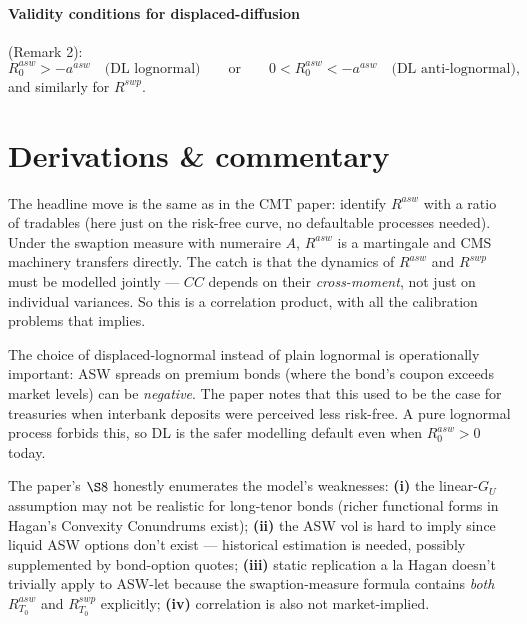 \documentclass[11pt,a4paper]{article}
\begin{document}
\paragraph{Validity conditions for displaced-diffusion} (Remark 2):
\begin{equation}\label{eq:cmasw-dl-validity}
  R^{asw}_0 > -a^{asw} \quad \text{(DL lognormal)} \qquad \text{or} \qquad 0 < R^{asw}_0 < -a^{asw} \quad \text{(DL anti-lognormal)},
\end{equation}
and similarly for $R^{swp}$.

\section{Derivations \& commentary}

\begin{commentary}
The headline move is the same as in the CMT paper: identify
$R^{asw}$ with a ratio of tradables (here just on the risk-free curve,
no defaultable processes needed). Under the swaption measure with
numeraire $A$, $R^{asw}$ is a martingale and CMS machinery transfers
directly. The catch is that the dynamics of $R^{asw}$ and $R^{swp}$
must be modelled jointly --- $CC$ depends on their
\emph{cross-moment}, not just on individual variances. So this is a
correlation product, with all the calibration problems that implies.
\end{commentary}

\begin{commentary}
The choice of displaced-lognormal instead of plain lognormal is
operationally important: ASW spreads on premium bonds (where the
bond's coupon exceeds market levels) can be \emph{negative}. The
paper notes that this used to be the case for treasuries when
interbank deposits were perceived less risk-free. A pure lognormal
process forbids this, so DL is the safer modelling default even when
$R^{asw}_0 > 0$ today.
\end{commentary}

\begin{commentary}
The paper's $\S 8$ honestly enumerates the model's weaknesses:
\textbf{(i)} the linear-$G_U$ assumption may not be realistic for
long-tenor bonds (richer functional forms in Hagan's Convexity
Conundrums exist); \textbf{(ii)} the ASW vol is hard to imply since
liquid ASW options don't exist --- historical estimation is needed,
possibly supplemented by bond-option quotes; \textbf{(iii)} static
replication a la Hagan doesn't trivially apply to ASW-let because
the swaption-measure formula contains \emph{both} $R^{asw}_{T_0}$
and $R^{swp}_{T_0}$ explicitly; \textbf{(iv)} correlation is also
not market-implied.
\end{commentary}
\end{document}
